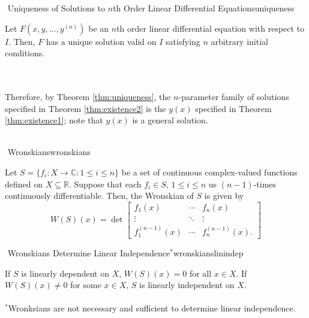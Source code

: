         \begin{theorem}{\Stop\,\,Uniqueness of Solutions to \(n\)th Order Linear Differential Equations}{uniqueness}
            
            Let \(F(x,y,\ldots,y^{(n)})\) be an \(n\)th order linear differential equation with respect to \(I\). Then, \(F\) has a unique solution valid on \(I\) satisfying \(n\) arbitrary initial conditions.

        \end{theorem}
        \vphantom
        \\
        \\
        Therefore, by Theorem \ref{thm:uniqueness}, the \(n\)-parameter family of solutions specified in Theorem \ref{thm:existence2} is the \(y(x)\) specified in Theorem \ref{thm:existence1}; note that \(y(x)\) is a general solution.
        \pagebreak
        \vphantom
        \\
        \\
        \begin{definition}{\Stop\,\,Wronskians}{wronskians}

            Let \(S=\{f_i:X\to\mathbb{C}:1\leq i\leq n\}\) be a set of continuous complex-valued functions defined on \(X\subseteq\mathbb{R}\). Suppose that each \(f_i\in S\), \(1\leq i\leq n\) us \((n-1)\)-times continuously differentiable. Then, the Wronskian of \(S\) is given by
            \begin{equation*}
                W(S)(x)=\det\begin{bmatrix}
                    f_1(x) & \cdots & f_n(x) \\
                    \vdots & \ddots & \vdots \\
                    f_1^{(n-1)}(x) & \cdots & f_n^{(n-1)}(x).
                \end{bmatrix}
            \end{equation*}
            
        \end{definition}
        \begin{theorem}{\Stop\,\,Wronskians Determine Linear Independence\(^*\)}{wronskianslinindep}

            If \(S\) is linearly dependent on \(X\), \(W(S)(x)=0\) for all \(x\in X\). If \(W(S)(x)\neq0\) for some \(x\in X\), \(S\) is linearly independent on \(X\).
            \\
            \\
            \(^*\)Wronksians are not necessary and sufficient to determine linear independence. 
            
        \end{theorem}
